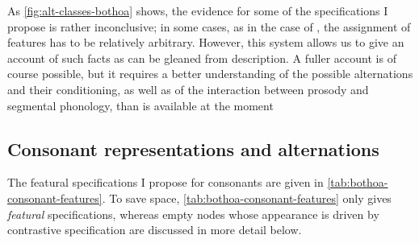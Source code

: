 As \cref{fig:alt-classes-bothoa} shows, the evidence for some of the specifications I propose is rather inconclusive; in some cases, as in the case of \ipa{[o]}, the assignment of features has to be relatively arbitrary. However, this system allows us to give an account of such facts as can be gleaned from  description. A fuller account is of course possible, but it requires a better understanding of the possible alternations and their conditioning, as well as of the interaction between prosody and segmental phonology, than is available at the moment

\subsection{Consonant representations and alternations}
\label{sec:cons-altern}


The featural specifications I propose for consonants are given in \cref{tab:bothoa-consonant-features}. To save space, \cref{tab:bothoa-consonant-features} only gives \emph{featural} specifications, whereas empty nodes whose appearance is driven by contrastive specification are discussed in more detail below.

